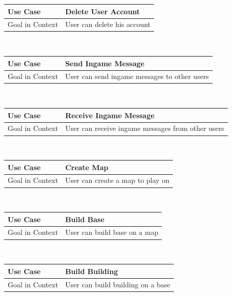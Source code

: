 \documentclass[a4paper]{article}
\begin{document}
\begin{tabular}[t]{|l|l|l|}
\hline
\textbf{Use Case}	&	\multicolumn{2}{|l|}{\textbf{Delete User Account}}\\
\hline
Goal in Context	&	\multicolumn{2}{|l|}{User can delete his account}\\
\hline
\end{tabular}\\

\begin{tabular}[t]{|l|l|l|}
\hline
\textbf{Use Case}	&	\multicolumn{2}{|l|}{\textbf{Send Ingame Message}}\\
\hline
Goal in Context	&	\multicolumn{2}{|l|}{User can send ingame messages to other users}\\
\hline
\end{tabular}\\

\begin{tabular}[t]{|l|l|l|}
\hline
\textbf{Use Case}	&	\multicolumn{2}{|l|}{\textbf{Receive Ingame Message}}\\
\hline
Goal in Context	&	\multicolumn{2}{|l|}{User can receive ingame messages from other users}\\
\hline
\end{tabular}\\

\begin{tabular}[t]{|l|l|l|}
\hline
\textbf{Use Case}	&	\multicolumn{2}{|l|}{\textbf{Create Map}}\\
\hline
Goal in Context	&	\multicolumn{2}{|l|}{User can create a map to play on}\\
\hline
\end{tabular}\\

\begin{tabular}[t]{|l|l|l|}
\hline
\textbf{Use Case}	&	\multicolumn{2}{|l|}{\textbf{Build Base}}\\
\hline
Goal in Context	&	\multicolumn{2}{|l|}{User can build base on a map}\\
\hline
\end{tabular}\\

\begin{tabular}[t]{|l|l|l|}
\hline
\textbf{Use Case}	&	\multicolumn{2}{|l|}{\textbf{Build Building}}\\
\hline
Goal in Context	&	\multicolumn{2}{|l|}{User can build building on a base}\\
\hline
\end{tabular}\\
\end{document}
